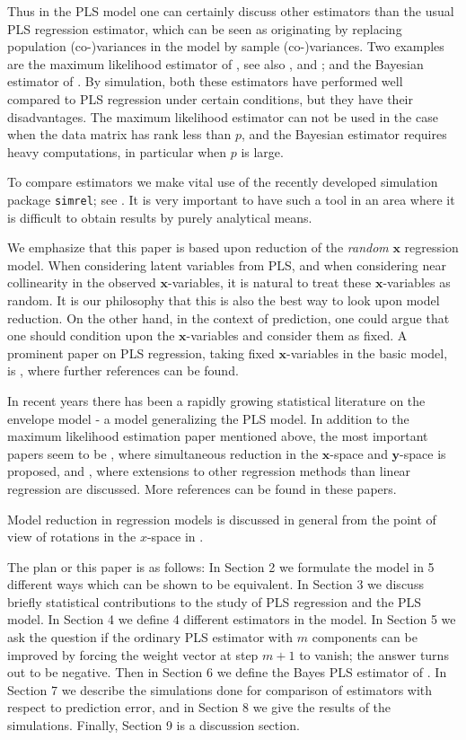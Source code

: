 \documentclass[num-refs]{wiley-article}
\begin{document}
Thus in the PLS model one can certainly discuss other estimators than the usual PLS regression estimator, which can be seen as originating by replacing population (co-)variances in the model by sample (co-)variances. Two examples are the maximum likelihood estimator of \citet{cook2013envelopes}, see also \citet{cook2015envlp}, \citet{cook2016note} and \citet{cook2016algorithms}; and the Bayesian estimator of \citet{helland2012near}. By simulation, both these estimators have performed well compared to PLS regression under certain conditions, but they have their disadvantages. The maximum likelihood estimator can not be used in the case when the data matrix has rank less than $p$, and the Bayesian estimator requires heavy computations, in particular when $p$ is large.

To compare estimators we make vital use of the recently developed simulation package {\tt simrel}; see \citet{saebo2015simrel}. It is very important to have such a tool in an area where it is difficult to obtain results by purely analytical means.

We emphasize that this paper is based upon reduction of the \emph{random} $\bm{x}$ regression model. When considering latent variables from PLS, and when considering near collinearity in the observed $\bm{x}$-variables, it is natural to treat these $\bm{x}$-variables as random. It is our philosophy that this is also the best way to look upon model reduction. On the other hand, in the context of prediction, one could argue that one should condition upon the $\bm{x}$-variables and consider them as fixed. A prominent paper on PLS regression, taking fixed $\bm{x}$-variables in the basic model, is \citet{kramer2012degrees}, where further references can be found.

In recent years there has been a rapidly growing statistical literature on the envelope model - a model generalizing the PLS model. In addition to the maximum likelihood estimation paper mentioned above, the most important papers seem to be \citet{cook2015simultaneous}, where simultaneous reduction in the $\bm{x}$-space and $\bm{y}$-space is proposed, and \citet{cook2015foundations}, where extensions to other regression methods than linear regression are discussed. More references can be found in these papers.

Model reduction in regression models is discussed in general from the point of view of rotations in the $x$-space in \citet{helland2001reduction}.

The plan or this paper is as follows: In Section 2 we formulate the model in 5 different ways which can be shown to be equivalent. In Section 3 we discuss briefly statistical contributions to the study of PLS regression and the PLS model. In Section 4 we define 4 different estimators in the model. In Section 5 we ask the question if the ordinary PLS estimator with $m$ components can be improved by forcing the weight vector at step $m+1$ to vanish; the answer turns out to be negative. Then in Section 6 we define the Bayes PLS estimator of \citet{helland2012near}. In Section 7 we describe the simulations done for comparison of estimators with respect to prediction error, and in Section 8 we give the results of the simulations. Finally, Section 9 is a discussion section.
\end{document}
